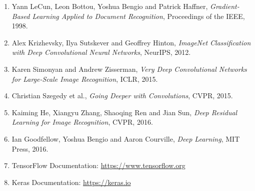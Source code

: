 \documentclass[11pt]{article}
\begin{document}
\begin{enumerate}

\item Yann LeCun, Leon Bottou, Yoshua Bengio and Patrick Haffner,
\emph{Gradient-Based Learning Applied to Document Recognition},
Proceedings of the IEEE, 1998.

\item Alex Krizhevsky, Ilya Sutskever and Geoffrey Hinton,
\emph{ImageNet Classification with Deep Convolutional Neural Networks},
NeurIPS, 2012.

\item Karen Simonyan and Andrew Zisserman,
\emph{Very Deep Convolutional Networks for Large-Scale Image Recognition},
ICLR, 2015.

\item Christian Szegedy et al.,
\emph{Going Deeper with Convolutions},
CVPR, 2015.

\item Kaiming He, Xiangyu Zhang, Shaoqing Ren and Jian Sun,
\emph{Deep Residual Learning for Image Recognition},
CVPR, 2016.

\item Ian Goodfellow, Yoshua Bengio and Aaron Courville,
\emph{Deep Learning},
MIT Press, 2016.

\item TensorFlow Documentation:
\url{https://www.tensorflow.org}

\item Keras Documentation:
\url{https://keras.io}

\end{enumerate}
\end{document}
